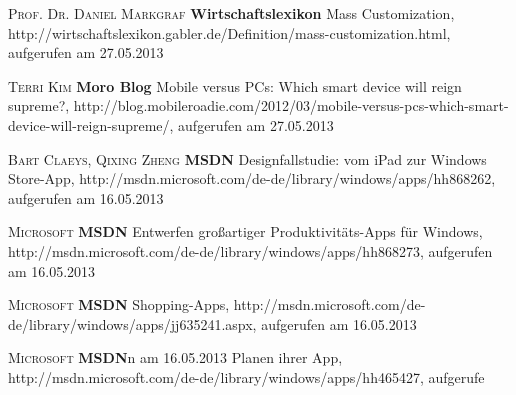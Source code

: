 \begin{thebibliography}{---}

           \textsc{Prof. Dr. Daniel Markgraf }
          \textbf{Wirtschaftslexikon}
          Mass Customization, http://wirtschaftslexikon.gabler.de/Definition/mass-customization.html, aufgerufen am 27.05.2013

           \textsc{Terri Kim}
          \textbf{Moro Blog}
          Mobile versus PCs: Which smart device will reign supreme?, http://blog.mobileroadie.com/2012/03/mobile-versus-pcs-which-smart-device-will-reign-supreme/, aufgerufen am 27.05.2013

           \textsc{Bart Claeys, Qixing Zheng}
          \textbf{MSDN}
          Designfallstudie: vom iPad zur Windows Store-App, http://msdn.microsoft.com/de-de/library/windows/apps/hh868262, aufgerufen am 16.05.2013
          
            \textsc{Microsoft}
           \textbf{MSDN}
           Entwerfen großartiger Produktivitäts-Apps für Windows, http://msdn.microsoft.com/de-de/library/windows/apps/hh868273, aufgerufen am 16.05.2013
           
              \textsc{Microsoft}
             \textbf{MSDN}
             Shopping-Apps, http://msdn.microsoft.com/de-de/library/windows/apps/jj635241.aspx, aufgerufen am 16.05.2013
             
                \textsc{Microsoft}
               \textbf{MSDN}n am 16.05.2013
 Planen ihrer App, http://msdn.microsoft.com/de-de/library/windows/apps/hh465427, aufgerufe

 
\end{thebibliography}

